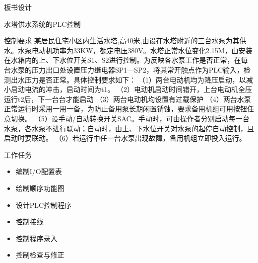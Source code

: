 {\begin{landscape}
\end{landscape}
\clearpage


\begin{center}
{\huge 板书设计}
\end{center}
}

\begin{frame}[containsverbatim]{水塔供水系统的PLC控制}
\begin{block}{控制要求}
某居民住宅小区内生活水塔,高40米,由设在水塔附近的三台水泵为其供水。水泵电动机功率为33KW，额定电压380V。水塔正常水位变化2.15M，由安装在水箱内的上、下水位开关S1、S2进行控制。为反映各水泵工作是否正常，在每台水泵的压力出口处设置压力继电器SP1—SP2，将其常开触点作为PLC输入，检测出水压力是否正常。具体控制要求如下：  （1）两台电动机均为降压启动，以减小启动电流的冲击，启动时间为t1。 （2）电动机启动时间错开，上台电动机全压运行t2后，下一台台才能启动 （3）两台电动机均设置有过载保护  （4）两台水泵正常运行时采用一用一备，为防止备用泵长期闲置锈蚀，要求备用机组可用按钮任意切换。  （5）设手动/自动转换开关SAC。手动时，可由操作者分别启动每一台水泵，各水泵不进行联动；自动时，由上、下水位开关对水泵的起停自动控制，且启动时要联动。  （6）若运行中任一台水泵出现故障，备用机组立即投入运行。 
\end{block}
\end{frame}
\begin{frame}{}
\begin{block}{工作任务}
\begin{itemize}
\item 编制I/O配置表
\item 绘制顺序功能图
\item 设计PLC控制程序
\item 控制接线
\item 控制程序录入
\item 控制检查与修正
\end{itemize}
\end{block}
\end{frame}


\endinput
